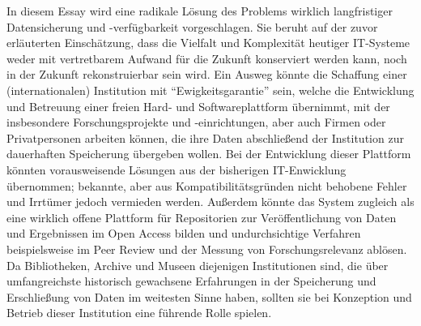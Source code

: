 In diesem Essay wird eine radikale Lösung des Problems wirklich
langfristiger Datensicherung und -verfügbarkeit vorgeschlagen. Sie
beruht auf der zuvor erläuterten Einschätzung, dass die Vielfalt und
Komplexität heutiger IT-Systeme weder mit vertretbarem Aufwand für die
Zukunft konserviert werden kann, noch in der Zukunft rekonstruierbar
sein wird. Ein Ausweg könnte die Schaffung einer (internationalen)
Institution mit ``Ewigkeitsgarantie'' sein, welche die Entwicklung und
Betreuung einer freien Hard- und Softwareplattform übernimmt, mit der
insbesondere Forschungsprojekte und -einrichtungen, aber auch Firmen
oder Privatpersonen arbeiten können, die ihre Daten abschließend der
Institution zur dauerhaften Speicherung übergeben wollen. Bei der
Entwicklung dieser Plattform könnten vorausweisende Lösungen aus der
bisherigen IT-Enwicklung übernommen; bekannte, aber aus
Kompatibilitätsgründen nicht behobene Fehler und Irrtümer jedoch
vermieden werden. Außerdem könnte das System zugleich als eine wirklich
offene Plattform für Repositorien zur Veröffentlichung von Daten und
Ergebnissen im Open Access bilden und undurchsichtige Verfahren
beispielsweise im Peer Review und der Messung von Forschungsrelevanz
ablösen. Da Bibliotheken, Archive und Museen diejenigen Institutionen
sind, die über umfangreichste historisch gewachsene Erfahrungen in der
Speicherung und Erschließung von Daten im weitesten Sinne haben, sollten
sie bei Konzeption und Betrieb dieser Institution eine führende Rolle
spielen.
